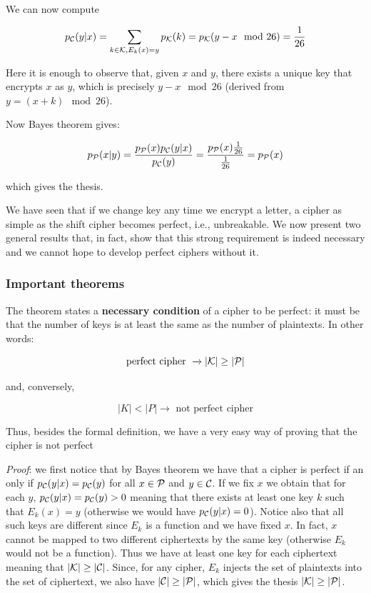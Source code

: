 We can now compute

$$p_{\cal C}(y|x) = \displaystyle \sum_{k \in {\cal K}, E_k(x)=y} {p_{\cal K}(k) } = p_{\cal K}(y-x \mod 26) = \frac{1}{26}$$

Here it is enough to observe that, given $x$ and $y$, there exists a unique key that encrypts $x$ as $y$, which is precisely $y-x\mod 26$ (derived from $y = (x+k) \mod 26$). 

Now Bayes theorem gives:

$$p_{\cal P}(x|y) =\displaystyle \frac{p_{\cal P}(x)p_{\cal C}(y|x)}{p_{\cal C}(y)}=\frac{p_{\cal P}(x)\frac{1}{26}}{\frac{1}{26}} = p_{\cal P}(x)$$

which gives the thesis.

We have seen that if we change key any time we encrypt a letter, a cipher as simple as the shift cipher becomes perfect, i.e., unbreakable. We now present two general results that, in fact, show that this strong requirement is indeed necessary and we cannot hope to develop perfect ciphers without it.

\subsubsection{Important theorems}

The theorem states a \textbf{necessary condition} of a cipher to be perfect: it must be that the number of keys is at least the same as the number of plaintexts. In other words:

$$
\text{perfect cipher } \xrightarrow{} |\cal K| \geq |\cal P| 
$$

and, conversely,

$$
|K| < |P| \xrightarrow{} \text{ not perfect cipher}
$$

Thus, besides the formal definition, we have a very easy way of proving that the cipher is not perfect

\textit{Proof}: we first notice that by Bayes theorem we have that a cipher is perfect if an only if $p_{\cal C}(y|x)=p_{\cal C}(y)$ for all $x \in {\cal P}$ and $y \in {\cal C}$. If we fix $x$ we obtain that for each $y$, $p_{\cal C}(y|x)=p_{\cal C}(y)>0$ meaning that there exists at least one key $k$ such that $E_k(x) = y$ (otherwise we would have $p_{\cal C}(y|x)=0$). Notice also that all such keys are different since $E_k$ is a function and we have fixed $x$. In fact, $x$ cannot be mapped to two different ciphertexts by the same key (otherwise $E_k$ would not be a function). Thus we have at least one key for each ciphertext meaning that $|{\cal K}| \geq |{\cal C}|$. Since, for any cipher, $E_k$ injects the set of plaintexts into the set of ciphertext, we also have $|{\cal C}| \geq |{\cal P}|$, which gives the thesis $|{\cal K}| \geq |{\cal P}|$.

